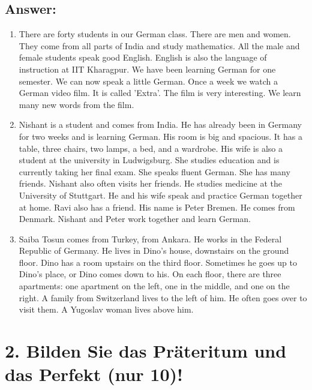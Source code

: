 \documentclass[a4paper,12pt]{article}
\begin{document}
\subsection*{Answer:}
\begin{enumerate}[label=(\Alph*)]
    \item There are forty students in our German class. There are men and women. They come from all parts of India and study mathematics. All the male and female students speak good English. English is also the language of instruction at IIT Kharagpur. We have been learning German for one semester. We can now speak a little German. Once a week we watch a German video film. It is called 'Extra'. The film is very interesting. We learn many new words from the film.

    \item Nishant is a student and comes from India. He has already been in Germany for two weeks and is learning German. His room is big and spacious. It has a table, three chairs, two lamps, a bed, and a wardrobe. His wife is also a student at the university in Ludwigsburg. She studies education and is currently taking her final exam. She speaks fluent German. She has many friends. Nishant also often visits her friends. He studies medicine at the University of Stuttgart. He and his wife speak and practice German together at home. Ravi also has a friend. His name is Peter Bremen. He comes from Denmark. Nishant and Peter work together and learn German.

    \item Saiba Tosun comes from Turkey, from Ankara. He works in the Federal Republic of Germany. He lives in Dino’s house, downstairs on the ground floor. Dino has a room upstairs on the third floor. Sometimes he goes up to Dino’s place, or Dino comes down to his. On each floor, there are three apartments: one apartment on the left, one in the middle, and one on the right. A family from Switzerland lives to the left of him. He often goes over to visit them. A Yugoslav woman lives above him.
\end{enumerate}


\section*{2. Bilden Sie das Präteritum und das Perfekt (nur 10)!}
\end{document}
